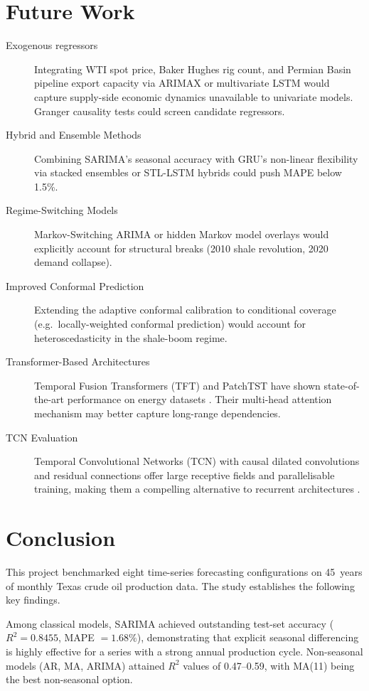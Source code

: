 \documentclass[12pt,a4paper]{article}
\begin{document}
\section{Future Work}

\begin{description}
  \item[Exogenous regressors] Integrating WTI spot price, Baker Hughes rig count, and Permian Basin pipeline export capacity via ARIMAX or multivariate LSTM would capture supply-side economic dynamics unavailable to univariate models. Granger causality tests could screen candidate regressors.
  \item[Hybrid and Ensemble Methods] Combining SARIMA's seasonal accuracy with GRU's non-linear flexibility via stacked ensembles or STL-LSTM hybrids could push MAPE below 1.5\%.
  \item[Regime-Switching Models] Markov-Switching ARIMA or hidden Markov model overlays would explicitly account for structural breaks (2010 shale revolution, 2020 demand collapse).
  \item[Improved Conformal Prediction] Extending the adaptive conformal calibration to conditional coverage (e.g.\ locally-weighted conformal prediction) would account for heteroscedasticity in the shale-boom regime.
  \item[Transformer-Based Architectures] Temporal Fusion Transformers (TFT) and PatchTST have shown state-of-the-art performance on energy datasets \citep{lim2021}. Their multi-head attention mechanism may better capture long-range dependencies.
  \item[TCN Evaluation] Temporal Convolutional Networks (TCN) with causal dilated convolutions and residual connections offer large receptive fields and parallelisable training, making them a compelling alternative to recurrent architectures \citep{bai2018}.
\end{description}

\section{Conclusion}

This project benchmarked eight time-series forecasting configurations on 45~years of monthly Texas crude oil production data. The study establishes the following key findings.

Among classical models, SARIMA achieved outstanding test-set accuracy ($R^2 = 0.8455$, MAPE $= 1.68\%$), demonstrating that explicit seasonal differencing is highly effective for a series with a strong annual production cycle. Non-seasonal models (AR, MA, ARIMA) attained $R^2$ values of 0.47--0.59, with MA(11) being the best non-seasonal option.
\end{document}
